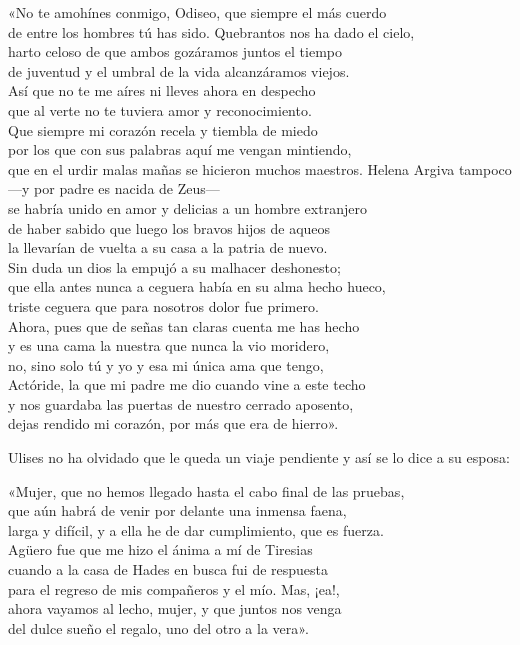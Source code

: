 \begin{versocita}
«No te amohínes conmigo, Odiseo, que siempre el más cuerdo\\
de entre los hombres tú has sido. Quebrantos nos ha dado el cielo,\\
harto celoso de que ambos gozáramos juntos el tiempo\\
de juventud y el umbral de la vida alcanzáramos viejos.\\
Así que no te me aíres ni lleves ahora en despecho\\
que al verte no te tuviera amor y reconocimiento.\\
Que siempre mi corazón recela y tiembla de miedo\\
por los que con sus palabras aquí me vengan mintiendo,\\
que en el urdir malas mañas se hicieron muchos maestros.
\stanzabreak
Helena Argiva tampoco ---y por padre es nacida de Zeus---\\
se habría unido en amor y delicias a un hombre extranjero\\
de haber sabido que luego los bravos hijos de aqueos\\
la llevarían de vuelta a su casa a la patria de nuevo.\\
Sin duda un dios la empujó a su malhacer deshonesto;\\
que ella antes nunca a ceguera había en su alma hecho hueco,\\
triste ceguera que para nosotros dolor fue primero.\\
Ahora, pues que de señas tan claras cuenta me has hecho\\
y es una cama la nuestra que nunca la vio moridero,\\
no, sino solo tú y yo y esa mi única ama que tengo,\\
Actóride, la que mi padre me dio cuando vine a este techo\\
y nos guardaba las puertas de nuestro cerrado aposento,\\
dejas rendido mi corazón, por más que era de hierro».
\end{versocita}

Ulises no ha olvidado que le queda un viaje pendiente y así se lo dice a su esposa:

\begin{versocita}
«Mujer, que no hemos llegado hasta el cabo final de las pruebas,\\
que aún habrá de venir por delante una inmensa faena,\\
larga y difícil, y a ella he de dar cumplimiento, que es fuerza.\\
Agüero fue que me hizo el ánima a mí de Tiresias\\
cuando a la casa de Hades en busca fui de respuesta\\
para el regreso de mis compañeros y el mío. Mas, ¡ea!,\\
ahora vayamos al lecho, mujer, y que juntos nos venga\\
del dulce sueño el regalo, uno del otro a la vera».
\end{versocita}

